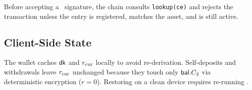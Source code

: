 Before accepting a \CE\ signature, the chain consults \texttt{lookup(ce)} and rejects the transaction unless the entry is registered, matches the asset, and is still active.

\subsection{Client-Side State}
The wallet caches $\textsf{dk}$ and $r_{\rm cur}$ locally to avoid re-derivation.
Self-deposits and withdrawals leave $r_{\rm cur}$ unchanged because they touch only $\mathsf{bal}.C_2$ via deterministic encryption ($r{=}0$).
Restoring on a clean device requires re-running \Rerand.



